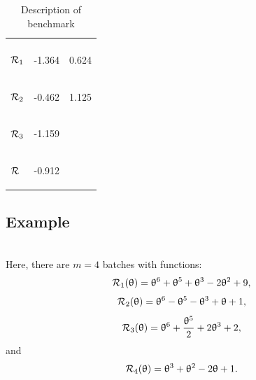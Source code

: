\documentclass[article,authoryear,jmlmc]{beg_32}             %
\begin{document}
\begin{table}[h!]
	\centering
	\caption{Description of benchmark \exSeven}
	\begin{tabular}{lll}
		
		\begin{bf} \diagbox{Functions}{Minimums} \end{bf} & \begin{bf}\mg\end{bf} & \begin{bf}\ml\end{bf} \\
		
		
		\begin{bf}$\mathcal{R}_1$\end{bf} & -1.364 & 0.624  \\ 
		\begin{bf}$\mathcal{R}_2$\end{bf} & -0.462 & 1.125 \\ 
		\begin{bf}$\mathcal{R}_3$\end{bf} & -1.159 &  \\ 
		\begin{bf}$\mathcal{R}$\end{bf}   & -0.912 &   \\ 
	\end{tabular}
	\label{ex7_example}
\end{table}

\subsection{Example \exHeight}
~~\\

Here, there are $m=4$ batches with functions:
\begin{equation*}
	\mathcal{R}_1(\uptheta) = \uptheta^6+\uptheta^5+\uptheta^3-2\uptheta^2+9,
\end{equation*}
\begin{equation*}
	\mathcal{R}_2(\uptheta) = \uptheta^6-\uptheta^5-\uptheta^3+\uptheta+1,
\end{equation*}
\begin{equation*}
	\mathcal{R}_3(\uptheta) = \uptheta^6+\frac{\uptheta^5}{2}+2\uptheta^3+2,
\end{equation*}
and
\begin{equation*}
	\mathcal{R}_4(\uptheta) = \uptheta^3+\uptheta^2-2\uptheta+1.
\end{equation*}
\end{document}
